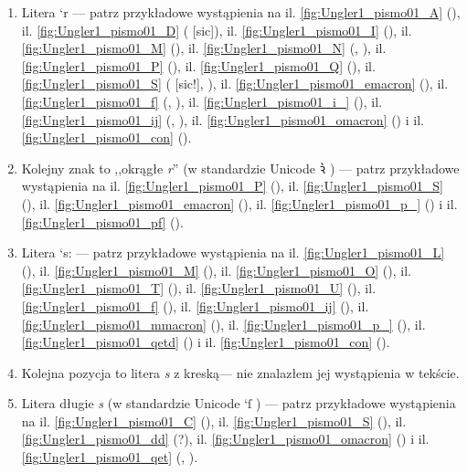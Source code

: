 \begin{enumerate}
\begin{enumerate}


\item Litera `r --- patrz przykładowe wystąpienia na
    il. \vref{fig:Ungler1_pismo01_A} (),
    il. \vref{fig:Ungler1_pismo01_D} ( [sic]),
    il. \vref{fig:Ungler1_pismo01_I} (),
    il. \vref{fig:Ungler1_pismo01_M} (),
    il. \vref{fig:Ungler1_pismo01_N} (, ),
    il. \vref{fig:Ungler1_pismo01_P} (),
    il. \vref{fig:Ungler1_pismo01_Q} (),
    il. \vref{fig:Ungler1_pismo01_S} ( [sic!], ),
    il. \vref{fig:Ungler1_pismo01_emacron} (),
    il. \vref{fig:Ungler1_pismo01_f} (, ), 
    il. \vref{fig:Ungler1_pismo01_i_} (),
il. \vref{fig:Ungler1_pismo01_ij} (, ),
   il. \vref{fig:Ungler1_pismo01_omacron} () i
  il. \vref{fig:Ungler1_pismo01_con} ().



\item Kolejny znak to ,,okrągłe \textit{r}'' (w standardzie Unicode
  \`ꝛ   )
--- patrz przykładowe wystąpienia na
    il. \vref{fig:Ungler1_pismo01_P} (),
    il. \vref{fig:Ungler1_pismo01_S} (),
    il. \vref{fig:Ungler1_pismo01_emacron} (),
    il. \vref{fig:Ungler1_pismo01_p_} () i
    il. \vref{fig:Ungler1_pismo01_pf} ().

\item  Litera `s: --- patrz przykładowe wystąpienia na
  il. \vref{fig:Ungler1_pismo01_L} (),
  il. \vref{fig:Ungler1_pismo01_M} (),
  il. \vref{fig:Ungler1_pismo01_O} (),
  il. \vref{fig:Ungler1_pismo01_T} (),
  il. \vref{fig:Ungler1_pismo01_U} (),
  il. \vref{fig:Ungler1_pismo01_f} (),
  il. \vref{fig:Ungler1_pismo01_ij} (),
      il. \vref{fig:Ungler1_pismo01_mmacron} (),
      il. \vref{fig:Ungler1_pismo01_p_} (),
 il. \vref{fig:Ungler1_pismo01_qetd} () i
  il. \vref{fig:Ungler1_pismo01_con} ().

  
\item Kolejna pozycja to litera \textit{s} z kreską--- nie znalazłem
  jej wystąpienia w tekście.

\item Litera długie \textit{s} (w standardzie Unicode `ſ 
  ) --- patrz przykładowe wystąpienia
  na il. \vref{fig:Ungler1_pismo01_C} (),
  il. \vref{fig:Ungler1_pismo01_S} (),
  il. \vref{fig:Ungler1_pismo01_dd} (?),
  il. \vref{fig:Ungler1_pismo01_omacron} () i
  il. \vref{fig:Ungler1_pismo01_qet} (,
  ).



\end{enumerate}
\end{enumerate}
